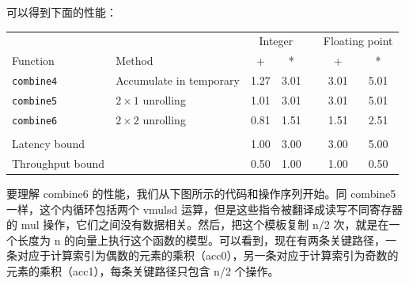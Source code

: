 可以得到下面的性能：

\begin{table}[!ht]
    \centering
    \begin{tabular}{llccccc}
        \toprule
        & & \multicolumn{2}{c}{Integer} & & \multicolumn{2}{c}{Floating point} \\
        \cmidrule{3-4} \cmidrule{6-7}
        Function & Method & + & * & & + & * \\
        \midrule
        \texttt{combine4} & Accumulate in temporary & 1.27 & 3.01 & & 3.01 & 5.01 \\
        \texttt{combine5} & $2 \times 1$ unrolling & 1.01 & 3.01 & & 3.01 & 5.01 \\
        \texttt{combine6} & $2 \times 2$ unrolling & 0.81 & 1.51 & & 1.51 & 2.51 \\
        \\
        Latency bound & & 1.00 & 3.00 & & 3.00 & 5.00 \\
        Throughput bound & & 0.50 & 1.00 & & 1.00 & 0.50 \\
        \bottomrule
    \end{tabular}
\end{table}

要理解 combine6 的性能，我们从下图所示的代码和操作序列开始。同 combine5 一样，这个内循环包括两个 vmulsd 运算，但是这些指令被翻译成读写不同寄存器的 mul 操作，它们之间没有数据相关。然后，把这个模板复制 n/2 次，就是在一个长度为 n 的向量上执行这个函数的模型。可以看到，现在有两条关键路径，一条对应于计算索引为偶数的元素的乘积（acc0），另一条对应于计算索引为奇数的元素的乘积（acc1），每条关键路径只包含 n/2 个操作。

